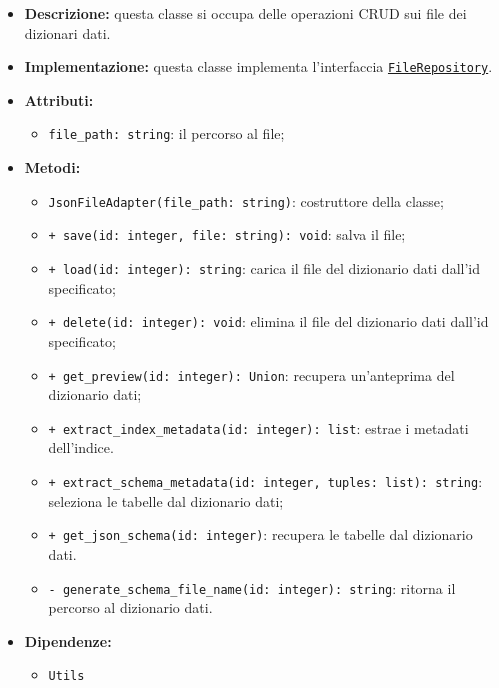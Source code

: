 \begin{itemize}
    \item \textbf{Descrizione:} questa classe si occupa delle operazioni CRUD sui file dei dizionari dati.
    \item \textbf{Implementazione:} questa classe implementa l'interfaccia \hyperref[FileRepository]{\texttt{FileRepository}}.
    \item \textbf{Attributi:}
    \begin{itemize}
        \item \texttt{file\_path: string}: il percorso al file;
    \end{itemize}
    \item \textbf{Metodi:}
    \begin{itemize}
        \item \texttt{JsonFileAdapter(file\_path: string)}: costruttore della classe;
        \item \texttt{+ save(id: integer, file: string): void}: salva il file;
        \item \texttt{+ load(id: integer): string}: carica il file del dizionario dati dall'id specificato;
        \item \texttt{+ delete(id: integer): void}: elimina il file del dizionario dati dall'id specificato;
        \item \texttt{+ get\_preview(id: integer): Union}: recupera un'anteprima del dizionario dati;
        \item \texttt{+ extract\_index\_metadata(id: integer): list}: estrae i metadati dell'indice.
        \item \texttt{+ extract\_schema\_metadata(id: integer, tuples: list): string}: seleziona le tabelle dal dizionario dati;
        \item \texttt{+ get\_json\_schema(id: integer)}: recupera le tabelle dal dizionario dati.
        \item \texttt{- generate\_schema\_file\_name(id: integer): string}: ritorna il percorso al dizionario dati. 
    \end{itemize}
    \item \textbf{Dipendenze:}
    \begin{itemize}
        \item \texttt{Utils}
    \end{itemize}
\end{itemize} 